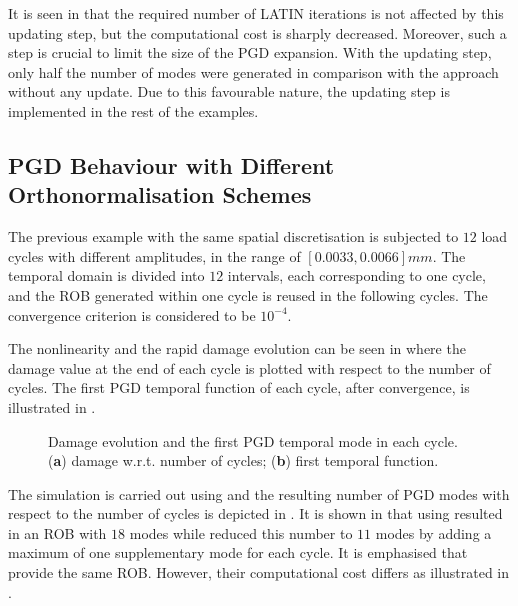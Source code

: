 It is seen in  {that the required number of LATIN iterations} is not affected by this updating step, but the computational cost is sharply decreased. Moreover, such a step is crucial to limit the size of the PGD expansion. With the updating step, only half the number of modes were generated in comparison with the approach without any update. Due to this favourable nature, the updating step is implemented in the rest of the examples.

\subsection{PGD Behaviour with Different Orthonormalisation Schemes}
The previous example with the same spatial discretisation is subjected to $12$ load cycles with different amplitudes, in the range of $[0.0033,0.0066]\unit{mm}$. The temporal domain is divided into $12$ intervals, each corresponding to one cycle, and the ROB generated within one cycle is reused in the following cycles. The convergence criterion is considered to be $10^{-4}$.

The nonlinearity and the rapid damage evolution can be seen in  where the damage value at the end of each cycle is plotted with respect to the number of cycles. The first PGD temporal function of each cycle, after convergence, is illustrated in .

\begin{figure}[hbt!]
	\centering
	\begin{subfigure}[]{0.49\linewidth}
		
		\caption{}
		\label{fig_damage_evolution12cycles_chapter6}
	\end{subfigure}
	\hfil
	\begin{subfigure}[]{0.49\linewidth}
		
		\caption{}
		\label{fig_pgdtemporal12cycles}
	\end{subfigure}
	\caption{Damage evolution and the first {PGD}
		temporal mode in each cycle. (\textbf{a}) damage w.r.t. number of cycles; (\textbf{b}) first temporal function.}
\end{figure}

The simulation is carried out using  and the resulting number of PGD modes with respect to the number of cycles is depicted in . It is shown in  that using  resulted in an ROB with $18$ modes while   reduced this number to $11$ modes by adding a maximum of one supplementary mode for each cycle. It is emphasised that  provide the same ROB. However, their computational cost differs as illustrated in .

